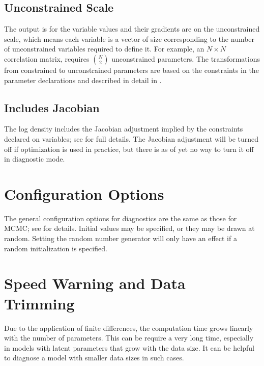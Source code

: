 \subsection{Unconstrained Scale}

The output is for the variable values and their gradients are on the
unconstrained scale, which means each variable is a vector of size
corresponding to the number of unconstrained variables required to
define it. For example, an $N \times N$ correlation matrix, requires
$\binom{N}{2}$ unconstrained parameters. The
transformations from constrained to unconstrained parameters are based
on the constraints in the parameter declarations and described in
detail in .

\subsection{Includes Jacobian}

The log density includes the Jacobian adjustment implied by the
constraints declared on variables; see
 for full details. The Jacobian
adjustment will be turned off if optimization is used in practice, but
there is as of yet no way to turn it off in diagnostic mode.

\section{Configuration Options}

The general configuration options for diagnostics are the same as
those for MCMC; see  for details. Initial
values may be specified, or they may be drawn at random. Setting the
random number generator will only have an effect if a random
initialization is specified.

\section{Speed Warning and Data Trimming}

Due to the application of finite differences, the computation time
grows linearly with the number of parameters. This can be require a
very long time, especially in models with latent parameters that grow
with the data size. It can be helpful to diagnose a model with smaller
data sizes in such cases.


